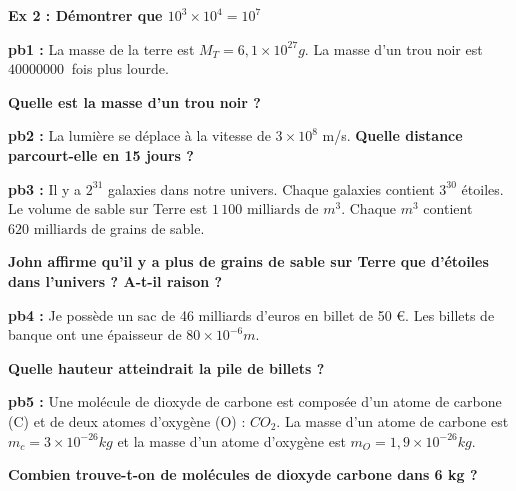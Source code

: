 \textbf{Ex 2 : Démontrer que $10^3 \times 10^4 = 10^7$}

\Pointilles[3]


\textbf{pb1 :} La masse de la terre est $M_T = 6,1 \times 10^{27} g$. La masse d'un trou noir est $\SI{40000000}{}$ fois plus lourde. 

\textbf{Quelle est la masse d'un trou noir ?}

\Pointilles[3]

\textbf{pb2 :} La lumière se déplace à la vitesse de $3 \times 10^8$ m/s. \textbf{Quelle distance parcourt-elle en 15 jours ?}

\Pointilles[3]

\textbf{pb3 :} Il y a $2^{31}$ galaxies dans notre univers. Chaque galaxies contient $3^{30}$ étoiles.  \\
Le volume de sable sur Terre est $1\,100 \text{ milliards de } m^3$. Chaque $m^3$ contient $620 \text{ milliards}$ de grains de sable. 

\textbf{John affirme qu'il y a plus de grains de sable sur Terre que d'étoiles dans l'univers ? A-t-il raison ?}

\Pointilles[5]

\textbf{pb4 :} Je possède un sac de 46 milliards d’euros en billet de 50 \euro{}. Les billets de banque ont une épaisseur de $80 \times 10^{-6} m$.

\textbf{Quelle hauteur atteindrait la pile de billets ?}

\Pointilles[6]

\textbf{pb5 :} Une molécule de dioxyde de carbone est composée d'un atome de carbone (C) et de deux atomes d'oxygène (O) : $CO_2$. La masse d'un atome de carbone est $ m_c = 3 \times 10^{-26}kg$ et la masse d'un atome d'oxygène est $ m_O = 1,9 \times 10^{-26}kg$. 

\textbf{Combien trouve-t-on de molécules de dioxyde carbone dans 6 kg ?}

\Pointilles[6]


